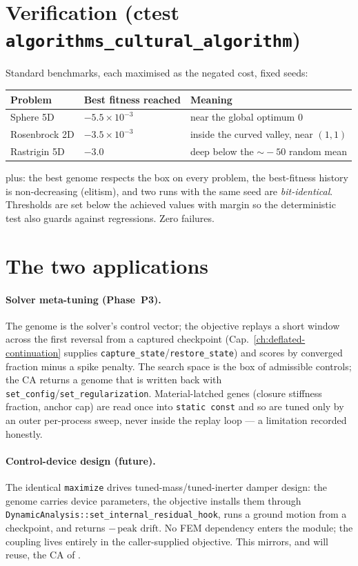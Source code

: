 \section{Verification (ctest \texttt{algorithms\_cultural\_algorithm})}

Standard benchmarks, each maximised as the negated cost, fixed seeds:
%
\begin{center}
\begin{tabular}{@{}lll@{}}
\toprule
Problem            & Best fitness reached & Meaning \\
\midrule
Sphere 5D          & \(-5.5\times10^{-3}\) & near the global optimum \(0\) \\
Rosenbrock 2D      & \(-3.5\times10^{-3}\) & inside the curved valley, near \((1,1)\) \\
Rastrigin 5D       & \(-3.0\)              & deep below the \(\sim\!-50\) random mean \\
\bottomrule
\end{tabular}
\end{center}
%
plus: the best genome respects the box on every problem, the
best-fitness history is non-decreasing (elitism), and two runs with the
same seed are \emph{bit-identical}. Thresholds are set below the achieved
values with margin so the deterministic test also guards against
regressions. Zero failures.

\section{The two applications}

\paragraph{Solver meta-tuning (Phase~P3).} The genome is the solver's
control vector; the objective replays a short window across the first
reversal from a captured checkpoint (Cap.~\ref{ch:deflated-continuation}
supplies \texttt{capture\_state}/\texttt{restore\_state}) and scores by
converged fraction minus a spike penalty. The search space is the box of
admissible controls; the CA returns a genome that is written back with
\texttt{set\_config}/\texttt{set\_regularization}. Material-latched genes
(closure stiffness fraction, anchor cap) are read once into
\texttt{static const} and so are tuned only by an outer per-process
sweep, never inside the replay loop --- a limitation recorded honestly.

\paragraph{Control-device design (future).} The identical
\texttt{maximize} drives tuned-mass/tuned-inerter damper design: the
genome carries device parameters, the objective installs them through
\texttt{DynamicAnalysis::set\_internal\_residual\_hook}, runs a ground
motion from a checkpoint, and returns \(-\,\text{peak drift}\). No FEM
dependency enters the module; the coupling lives entirely in the
caller-supplied objective. This mirrors, and will reuse, the CA of
\cite{LaraValenciaEchavarriaValencia2024}.
